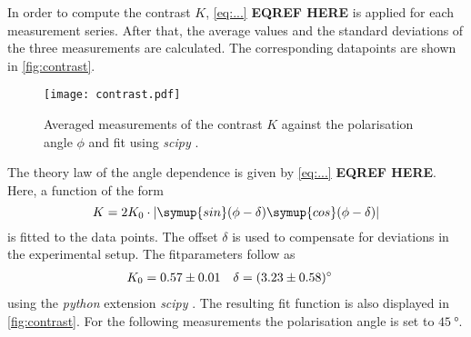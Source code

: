 In order to compute the contrast $K$, \autoref{eq:...} \textbf{EQREF HERE} is applied for each measurement series. After that, the average values and the standard deviations of the three measurements are calculated. The corresponding datapoints are shown in 
\autoref{fig:contrast}. 
\begin{figure}
  \centering
  \texttt{[image: contrast.pdf]}
  \caption{Averaged measurements of the contrast $K$ against the polarisation angle $\phi$ and fit using \textit{scipy} \cite{scipy}.}
  \label{fig:contrast}
\end{figure}
The theory law of the angle dependence is given by \autoref{eq:...} \textbf{EQREF HERE}. Here, a function of the form 
\begin{equation*}
  K = 2K_0 \cdot \lvert \symup{sin}(\phi - \delta)\symup{cos}(\phi - \delta) \rvert
\end{equation*}
is fitted to the data points. The offset $\delta$ is used to compensate for deviations in the experimental setup. 
The fitparameters follow as 
\begin{align*}
  K_0 &= \num{0.57 +- 0.01} & \delta &= \qty{3.23 +- 0.58}{\degree}
\end{align*}
using the \textit{python} extension \textit{scipy} \cite{scipy}. The resulting fit function is also displayed in \autoref{fig:contrast}.
For the following measurements the polarisation angle is set to $\qty{45}{\degree}$.

